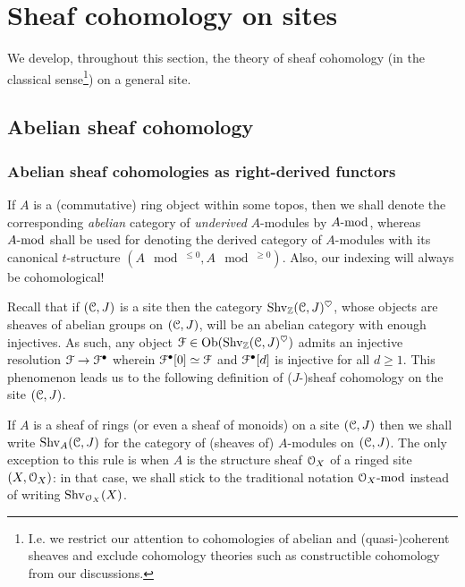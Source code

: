 \section{Sheaf cohomology on sites}
    We develop, throughout this section, the theory of sheaf cohomology (in the classical sense\footnote{I.e. we restrict our attention to cohomologies of abelian and (quasi-)coherent sheaves and exclude cohomology theories such as constructible cohomology from our discussions.}) on a general site. 

    \subsection{Abelian sheaf cohomology}
        \subsubsection{Abelian sheaf cohomologies as right-derived functors}
            \begin{convention}
                If $A$ is a (commutative) ring object within some topos, then we shall denote the corresponding \textit{abelian} category of \textit{underived} $A$-modules by $A\mod$, whereas $A\mod$ shall be used for denoting the derived category of $A$-modules with its canonical $t$-structure $(A\mod^{\leq 0}, A\mod^{\geq 0})$. Also, our indexing will always be cohomological! 
            \end{convention}
            \begin{remark}
                Recall that if $(\C, J)$ is a site then the category $\Shv_{\Z}(\C, J)^{\heart}$, whose objects are sheaves of abelian groups on $(\C, J)$, will be an abelian category with enough injectives. As such, any object $\calF \in \Ob(\Shv_{\Z}(\C, J)^{\heart})$ admits an injective resolution $\calF \to \calF^{\bullet}$ wherein $\calF^{\bullet}[0] \cong \calF$ and $\calF^{\bullet}[d]$ is injective for all $d \geq 1$. This phenomenon leads us to the following definition of ($J$-)sheaf cohomology on the site $(\C, J)$.
            \end{remark}
            \begin{convention}
                If $A$ is a sheaf of rings (or even a sheaf of monoids) on a site $(\C, J)$ then we shall write $\Shv_A(\C, J)$ for the category of (sheaves of) $A$-modules on $(\C, J)$. The only exception to this rule is when $A$ is the structure sheaf $\calO_X$ of a ringed site $(X, \calO_X)$: in that case, we shall stick to the traditional notation $\calO_X\mod$ instead of writing $\Shv_{\calO_X}(X)$.
            \end{convention}
